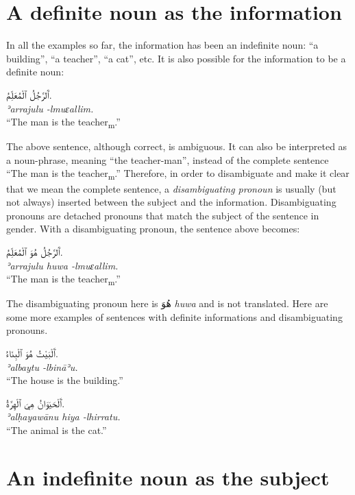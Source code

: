 \documentclass[
  10pt,
]{book}
\begin{document}
\section{A definite noun as the information}\label{chap-smp-sent-sec-def-info}

In all the examples so far, the information has been an indefinite noun: \enquote{a building}, \enquote{a teacher}, \enquote{a cat}, etc. It is also possible for the information to be a definite noun:

\foreignlanguage{arabic}{ٱَلرَّجُلُ ٱلْمُعَلِّمُ.}\\
\emph{ʾarrajulu -lmuɛallim.}\\
\enquote{The man is the teacher\textsubscript{m}.}

The above sentence, although correct, is ambiguous. It can also be interpreted as a noun-phrase, meaning \enquote{the teacher-man}, instead of the complete sentence \enquote{The man is the teacher\textsubscript{m}.} Therefore, in order to disambiguate and make it clear that we mean the complete sentence, a \emph{disambiguating pronoun} is usually (but not always) inserted between the subject and the information.
Disambiguating pronouns are detached pronouns that match the subject of the sentence in gender. With a disambiguating pronoun, the sentence above becomes:

\foreignlanguage{arabic}{ٱَلرَّجُلُ هُوَ ٱلْمُعَلِّمُ.}\\
\emph{ʾarrajulu huwa -lmuɛallim.}\\
\enquote{The man is the teacher\textsubscript{m}.}

The disambiguating pronoun here is \foreignlanguage{arabic}{هُوَ} \emph{huwa} and is not translated. Here are some more examples of sentences with definite informations and disambiguating pronouns.

\foreignlanguage{arabic}{ٱَلْبَيْتُ هُوَ ٱلْبِنَاءُ.}\\
\emph{ʾalbaytu -lbināʾu.}\\
\enquote{The house is the building.}

\foreignlanguage{arabic}{ٱَلْحَيَوَانُ هِيَ ٱلْهِرَّةُ.}\\
\emph{ʾalḥayawānu hiya -lhirratu.}\\
\enquote{The animal is the cat.}

\section{An indefinite noun as the subject}\label{an-indefinite-noun-as-the-subject}
\end{document}
